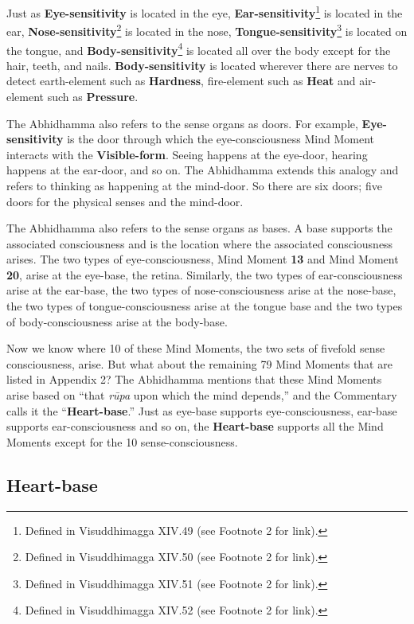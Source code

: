 Just as \textbf{Eye-sensitivity} is located in the eye, \textbf{Ear-sensitivity}\footnote{Defined in Visuddhimagga XIV.49 (see Footnote 2 for link).} is located in the ear, \textbf{Nose-sensitivity}\footnote{Defined in Visuddhimagga XIV.50 (see Footnote 2 for link).} is located in the nose, \textbf{Tongue-sensitivity}\footnote{Defined in Visuddhimagga XIV.51 (see Footnote 2 for link).} is located on the tongue, and \textbf{Body-sensitivity}\footnote{Defined in Visuddhimagga XIV.52 (see Footnote 2 for link).} is located all over the body except for the hair, teeth, and nails. \textbf{Body-sensitivity} is located wherever there are nerves to detect earth-element such as \textbf{Hardness}, fire-element such as \textbf{Heat} and air-element such as \textbf{Pressure}.

\pagebreak

The Abhidhamma also refers to the sense organs as doors. For example, \textbf{Eye-sensitivity} is the door through which the eye-consciousness Mind Moment interacts with the \textbf{Visible-form}. Seeing happens at the eye-door, hearing happens at the ear-door, and so on. The Abhidhamma extends this analogy and refers to thinking as happening at the mind-door. So there are six doors; five doors for the physical senses and the mind-door.

The Abhidhamma also refers to the sense organs as bases. A base supports the associated consciousness and is the location where the associated consciousness arises. The two types of eye-consciousness, Mind Moment \textbf{13} and Mind Moment \textbf{20}, arise at the eye-base, the retina. Similarly, the two types of ear-consciousness arise at the ear-base, the two types of nose-consciousness arise at the nose-base, the two types of tongue-consciousness arise at the tongue base and the two types of body-consciousness arise at the body-base.

Now we know where 10 of these Mind Moments, the two sets of fivefold sense consciousness, arise. But what about the remaining 79 Mind Moments that are listed in Appendix 2? The Abhidhamma mentions that these Mind Moments arise based on “that \textit{rūpa} upon which the mind depends,” and the Commentary calls it the “\textbf{Heart-base}.” Just as eye-base supports eye-consciousness, ear-base supports ear-consciousness and so on, the \textbf{Heart-base} supports all the Mind Moments except for the 10 sense-consciousness.

\subsection*{Heart-base}

